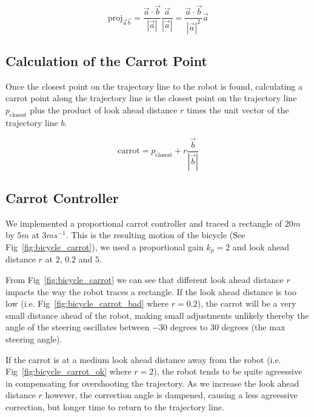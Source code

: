 \documentclass{article}
\begin{document}
\begin{equation}
	\text{proj}_{\vec{a}\vec{b}} 
		= \dfrac{\vec{a} \cdot \vec{b}}{|\vec{a}|}
			\dfrac{\vec{a}}{|\vec{a}|} 
		= \dfrac{\vec{a} \cdot \vec{b}}{|\vec{a}|^{2}}
			\vec{a}
\end{equation}


\newpage
\subsection{Calculation of the Carrot Point}
Once the closest point on the trajectory line to the robot is found, calculating a carrot point along the trajectory line is the closest point on the trajectory line $p_{\text{closest}}$ plus the product of look ahead distance $r$ times the unit vector of the trajectory line $b$.

\begin{equation}
	\text{carrot} = p_{\text{closest}} + r \dfrac{\vec{b}}{|\vec{b}|}
\end{equation}



\subsection{Carrot Controller}
We implemented a proportional carrot controller and traced a rectangle of $20m$ by $5m$ at $3ms^{-1}$. This is the resulting motion of the bicycle (See Fig~\ref{fig:bicycle_carrot}), we used a proportional gain $k_{p} = 2$ and look ahead distance $r$ at $2$, $0.2$ and $5$. 

From Fig~\ref{fig:bicycle_carrot} we can see that different look ahead distance $r$ impacts the way the robot traces a rectangle. If the look ahead distance is too low (i.e. Fig~\ref{fig:bicycle_carrot_bad} where $r = 0.2$), the carrot will be a very small distance ahead of the robot, making small adjustments unlikely thereby the angle of the steering oscillates between $-30$ degrees to $30$ degrees (the max steering angle).

If the carrot is at a medium look ahead distance away from the robot  (i.e. Fig~\ref{fig:bicycle_carrot_ok} where $r = 2$), the robot tends to be quite agreessive in compensating for overshooting the trajectory. As we increase the look ahead distance $r$ however, the correction angle is dampened, causing a less agreessive correction, but longer time to return to the trajectory line.
\end{document}
